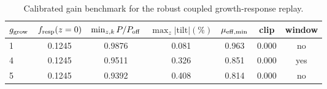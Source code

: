 \begin{table}[t]
\centering
\begin{tabular}{lcccccc}
\hline
$g_{\rm grow}$ & $f_{\rm resp}(z=0)$ & $\min_{z,k}P/P_{\rm off}$ & $\max_{z}|\mathrm{tilt}|(\%)$ & $\mu_{\rm eff,min}$ & clip & window \\
\hline
1 & 0.1245 & 0.9876 & 0.081 & 0.963 & 0.000 & no \\
4 & 0.1245 & 0.9511 & 0.326 & 0.851 & 0.000 & yes \\
5 & 0.1245 & 0.9392 & 0.408 & 0.814 & 0.000 & no \\
\hline
\end{tabular}
\caption{Calibrated gain benchmark for the robust coupled growth-response replay.}
\label{tab:coupled_gain_calibration}
\end{table}
